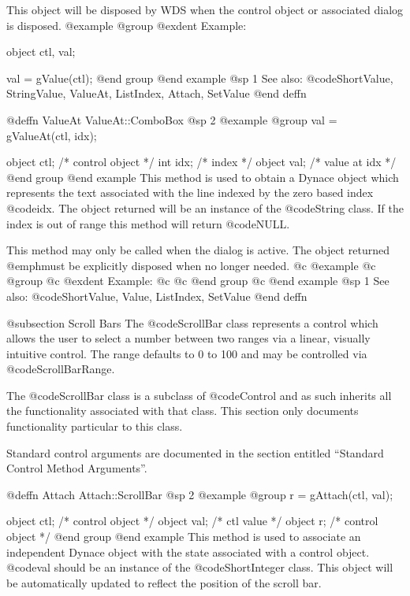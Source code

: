 This object will be disposed by WDS when the control object or
associated dialog is disposed.
@example
@group
@exdent Example:

object  ctl, val;

val = gValue(ctl);
@end group
@end example
@sp 1
See also:  @code{ShortValue, StringValue, ValueAt, ListIndex, Attach, SetValue}
@end deffn






@deffn {ValueAt} ValueAt::ComboBox
@sp 2
@example
@group
val = gValueAt(ctl, idx);

object  ctl;   /*  control object  */
int     idx;   /*  index           */
object  val;   /*  value at idx    */
@end group
@end example
This method is used to obtain a Dynace object which represents the text
associated with the line indexed by the zero based index @code{idx}.
The object returned will be an instance of the @code{String} class.  If
the index is out of range this method will return @code{NULL}.

This method may only be called when the dialog is active.  The object
returned @emph{must} be explicitly disposed when no longer needed.
@c @example
@c @group
@c @exdent Example:
@c 
@c @end group
@c @end example
@sp 1
See also:  @code{ShortValue, Value, ListIndex, SetValue}
@end deffn









@subsection Scroll Bars
The @code{ScrollBar} class represents a control which allows the user to
select a number between two ranges via a linear, visually intuitive
control.  The range defaults to 0 to 100 and may be controlled via
@code{ScrollBarRange}.

The @code{ScrollBar} class is a subclass of @code{Control} and as such
inherits all the functionality associated with that class.  This section
only documents functionality particular to this class.

Standard control arguments are documented in the section entitled
``Standard Control Method Arguments''.










@deffn {Attach} Attach::ScrollBar
@sp 2
@example
@group
r = gAttach(ctl, val);

object  ctl;   /*  control object  */
object  val;   /*  ctl value       */
object  r;     /*  control object  */
@end group
@end example
This method is used to associate an independent Dynace object with the
state associated with a control object.  @code{val} should be an
instance of the @code{ShortInteger} class.  This object will be
automatically updated to reflect the position of the scroll bar.

